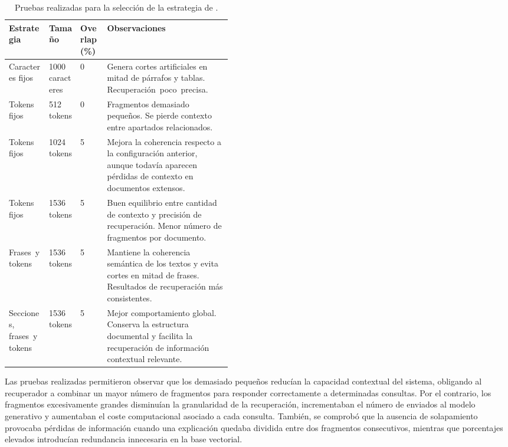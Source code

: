 \begin{table}[p]
	\centering
	\begin{tabularx}{\linewidth}{p{0.18\linewidth} p{0.14\linewidth} p{0.12\linewidth} X}
		\toprule
		\textbf{Estrategia} & \textbf{Tamaño} & \textbf{Overlap (\%)} & \textbf{Observaciones} \\
		\midrule
		Caracteres \mbox{fijos} &
		1000 \mbox{caracteres} &
		0 &
		Genera cortes artificiales en mitad de párrafos y tablas. \mbox{Recuperación poco precisa.} \\
		
		Tokens \mbox{fijos} &
		512 \mbox{tokens} &
		0 &
		Fragmentos demasiado pequeños. Se pierde contexto entre apartados relacionados. \\
		
		Tokens \mbox{fijos} &
		1024 \mbox{tokens} &
		5 &
		Mejora la coherencia respecto a la configuración anterior, aunque todavía aparecen pérdidas de contexto en documentos extensos. \\
		
		Tokens \mbox{fijos} &
		1536 \mbox{tokens} &
		5 &
		Buen equilibrio entre cantidad de contexto y precisión de recuperación. Menor número de fragmentos por documento. \\
		
		\mbox{Frases y} \mbox{tokens} &
		1536 \mbox{tokens} &
		5 &
		Mantiene la coherencia semántica de los textos y evita cortes en mitad de frases. Resultados de recuperación más consistentes. \\
		
		\mbox{Secciones,} \mbox{frases y} \mbox{tokens} &
		1536 \mbox{tokens} &
		5 &
		Mejor comportamiento global. Conserva la estructura documental y facilita la recuperación de información contextual relevante. \\
		\bottomrule
	\end{tabularx}
	\caption{Pruebas realizadas para la selección de la estrategia de .}
	\label{tabla:experimentos_chunking}
\end{table}

Las pruebas realizadas permitieron observar que los  demasiado pequeños reducían la capacidad contextual del sistema, obligando al recuperador a combinar un mayor número de fragmentos para responder correctamente a determinadas consultas. Por el contrario, los fragmentos excesivamente grandes disminuían la granularidad de la recuperación, incrementaban el número de  enviados al modelo generativo y aumentaban el coste computacional asociado a cada consulta. También, se comprobó que la ausencia de solapamiento provocaba pérdidas de información cuando una explicación quedaba dividida entre dos fragmentos consecutivos, mientras que porcentajes elevados introducían redundancia innecesaria en la base vectorial.


